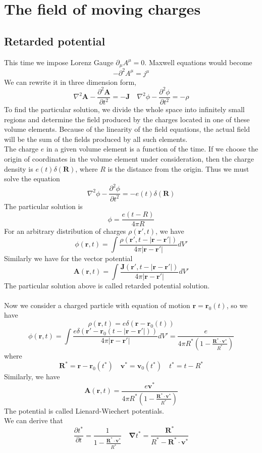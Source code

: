 \section{The field of moving charges}
\subsection{Retarded potential}
This time we impose Lorenz Gauge $\partial_{\mu} A^{\mu} = 0$. Maxwell equations would become
\[-\partial^2 A^{\mu} = j^{\mu}\]
We can rewrite it in three dimension form,
\[\nabla^2 \bm{A} - \frac{\partial^2 \bm{A}}{\partial t^2} = -\bm{J} \quad \nabla^2 \phi - \frac{\partial^2\phi}{\partial t^2} = -\rho\]
To find the particular solution, we divide the whole space into infinitely small regions and determine the field produced by the charges located in one of these volume elements. Because of the linearity of the field equations, the actual field will be the sum of the fields produced by all such elements. \\
The charge $e$ in a given volume element is a function of the time. If we choose the origin of coordinates in the volume element under consideration, then the charge density is $e(t)\delta(\bm{R})$, where $R$ is the distance from the origin. Thus we must solve the equation
\[\nabla^2 \phi - \frac{\partial^2\phi}{\partial t^2} = -e(t)\delta(\bm{R})\]
The particular solution is
\[\phi = \frac{e(t-R)}{4\pi R}\]
For an arbitrary distribution of charges $\rho(\bm{r}',t)$, we have
\[\phi(\bm{r},t) = \int \frac{\rho(\bm{r}',t-|\bm{r}-\bm{r}'|)}{4\pi |\bm{r}-\bm{r}'|} dV'\]
Similarly we have for the vector potential
\[\bm{A}(\bm{r},t) = \int \frac{\bm{J}(\bm{r}',t-|\bm{r}-\bm{r}'|)}{4\pi |\bm{r}-\bm{r}'|} dV'\]
The particular solution above is called retarded potential solution.
\\ \\
Now we consider a charged particle with equation of motion $\bm{r} = \bm{r}_0(t)$, so we have
\[\rho(\bm{r},t) = e\delta(\bm{r}-\bm{r}_0(t))\]
\[\phi(\bm{r},t) = \int \frac{e \delta (\bm{r}'-\bm{r}_0(t-|\bm{r}-\bm{r}'|))}{4\pi |\bm{r}-\bm{r}'|} dV' = \frac{e}{4\pi R^* (1 - \frac{\bm{R}^* \cdot \bm{v}^*}{R^*})}\]
where 
\[\bm{R}^* = \bm{r} - \bm{r}_0(t^*) \quad \bm{v}^* = \bm{v}_0(t^*) \quad t^* = t - R^*\]
Similarly, we have
\[\bm{A}(\bm{r},t) = \frac{e\bm{v}^*}{4\pi R^* (1 - \frac{\bm{R}^* \cdot \bm{v}^*}{R^*})}\]
The potential is called Lienard-Wiechert potentials.\\
We can derive that
\[\frac{\partial t^*}{\partial t} = \frac{1}{1- \frac{\bm{R}^* \cdot \bm{v}^*}{R^*}} \quad \bm{\nabla} t^* = \frac{\bm{R}^*}{R^* - \bm{R}^* \cdot \bm{v}^*}\]
